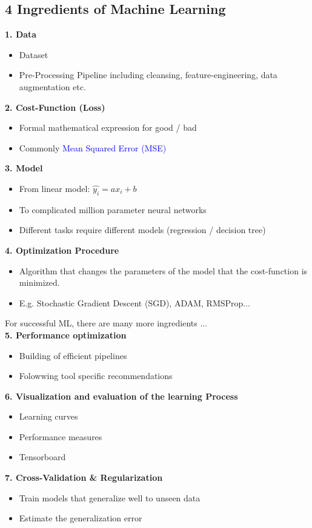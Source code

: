 \subsection{4 Ingredients of Machine Learning}
\textbf{1. Data}
\begin{itemize}
    \item Dataset
    \item Pre-Processing Pipeline including cleansing, feature-engineering, data augmentation etc.
\end{itemize}
\textbf{2. Cost-Function (Loss)}
\begin{itemize}
    \item Formal mathematical expression for good / bad
    \item Commonly \textcolor{blue}{Mean Squared Error (MSE)}
\end{itemize}
\textbf{3. Model}
\begin{itemize}
    \item From linear model: $\hat{y_i} = ax_i + b$
    \item To complicated million parameter neural networks
    \item Different tasks require different models (regression / decision tree)
\end{itemize}
\textbf{4. Optimization Procedure}
\begin{itemize}
    \item Algorithm that changes the parameters of the model that the cost-function is minimized.
    \item E.g. Stochastic Gradient Descent (SGD), ADAM, RMSProp...
\end{itemize}

For successful ML, there are many more ingredients ...\\
\textbf{5. Performance optimization}
\begin{itemize}
    \item Building of efficient pipelines
    \item Folowwing tool specific recommendations
\end{itemize}
\textbf{6. Visualization and evaluation of the learning Process}
\begin{itemize}
    \item Learning curves
    \item Performance measures
    \item Tensorboard
\end{itemize}
\textbf{7. Cross-Validation \& Regularization}
\begin{itemize}
    \item Train models that generalize well to unseen data
    \item Estimate the generalization error
\end{itemize}

